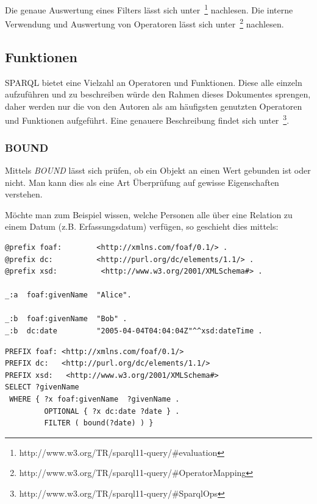 Die genaue Auswertung eines Filters lässt sich unter~\footnote{http://www.w3.org/TR/sparql11-query/\#evaluation} nachlesen. Die interne Verwendung und Auswertung von Operatoren lässt sich unter~\footnote{http://www.w3.org/TR/sparql11-query/\#OperatorMapping} nachlesen.

\subsection{Funktionen}
\label{subsec:sparql_ausdruecke_funktionen}

SPARQL bietet eine Vielzahl an Operatoren und Funktionen. Diese alle einzeln aufzuführen und zu beschreiben würde den Rahmen dieses Dokumentes sprengen, daher werden nur die von den Autoren als am häufigsten genutzten Operatoren und Funktionen aufgeführt. Eine genauere Beschreibung findet sich unter~\footnote{http://www.w3.org/TR/sparql11-query/\#SparqlOps}.

\subsubsection{BOUND}
\label{subsec:sparql_ausdruecke_funktionen_bound}
Mittels \textit{BOUND} lässt sich prüfen, ob ein Objekt an einen Wert gebunden ist oder nicht. Man kann dies als eine Art Überprüfung auf gewisse Eigenschaften verstehen.

Möchte man zum Beispiel wissen, welche Personen alle über eine Relation zu einem Datum (z.B. Erfassungsdatum) verfügen, so geschieht dies mittels:

\begin{lstlisting}
@prefix foaf:        <http://xmlns.com/foaf/0.1/> .
@prefix dc:          <http://purl.org/dc/elements/1.1/> .
@prefix xsd:          <http://www.w3.org/2001/XMLSchema#> .

_:a  foaf:givenName  "Alice".

_:b  foaf:givenName  "Bob" .
_:b  dc:date         "2005-04-04T04:04:04Z"^^xsd:dateTime .
\end{lstlisting}

\begin{lstlisting}
PREFIX foaf: <http://xmlns.com/foaf/0.1/>
PREFIX dc:   <http://purl.org/dc/elements/1.1/>
PREFIX xsd:   <http://www.w3.org/2001/XMLSchema#>
SELECT ?givenName
 WHERE { ?x foaf:givenName  ?givenName .
         OPTIONAL { ?x dc:date ?date } .
         FILTER ( bound(?date) ) }
\end{lstlisting}

